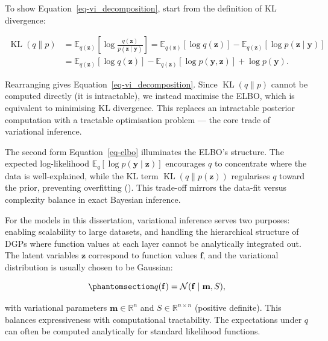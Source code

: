 \documentclass[
  letterpaper,
  DIV=11,
  numbers=noendperiod]{scrartcl}
\begin{document}
To show Equation~\ref{eq-vi_decomposition}, start from the definition of
KL divergence:

\[
\begin{aligned}
\operatorname{KL}(q \| p) &= \mathbb{E}_{q(\mathbf{z})}\left[\log \frac{q(\mathbf{z})}{p(\mathbf{z} \mid \mathbf{y})}\right] = \mathbb{E}_{q(\mathbf{z})}[\log q(\mathbf{z})] - \mathbb{E}_{q(\mathbf{z})}[\log p(\mathbf{z} \mid \mathbf{y})] \\
&= \mathbb{E}_{q(\mathbf{z})}[\log q(\mathbf{z})] - \mathbb{E}_{q(\mathbf{z})}[\log p(\mathbf{y}, \mathbf{z})] + \log p(\mathbf{y}).
\end{aligned}
\]

Rearranging gives Equation~\ref{eq-vi_decomposition}. Since
\(\operatorname{KL}(q \| p)\) cannot be computed directly (it is
intractable), we instead maximise the ELBO, which is equivalent to
minimising KL divergence. This replaces an intractable posterior
computation with a tractable optimisation problem --- the core trade of
variational inference.

The second form Equation~\ref{eq-elbo} illuminates the ELBO's structure.
The expected log-likelihood
\(\mathbb{E}_{q}[\log p(\mathbf{y} \mid \mathbf{z})]\) encourages \(q\)
to concentrate where the data is well-explained, while the KL term
\(\operatorname{KL}(q \| p(\mathbf{z}))\) regularises \(q\) toward the
prior, preventing overfitting (). This trade-off mirrors the data-fit versus complexity balance in
exact Bayesian inference.

For the models in this dissertation, variational inference serves two
purposes: enabling scalability to large datasets, and handling the
hierarchical structure of DGPs where function values at each layer
cannot be analytically integrated out. The latent variables
\(\mathbf{z}\) correspond to function values \(\mathbf{f}\), and the
variational distribution is usually chosen to be Gaussian:

\begin{equation}\phantomsection\label{eq-variational_gaussian}{
q(\mathbf{f}) = \mathcal{N}(\mathbf{f} \mid \mathbf{m}, S),
}\end{equation}

with variational parameters \(\mathbf{m} \in \mathbb{R}^n\) and
\(S \in \mathbb{R}^{n \times n}\) (positive definite). This balances
expressiveness with computational tractability. The expectations under
\(q\) can often be computed analytically for standard likelihood
functions.
\end{document}
